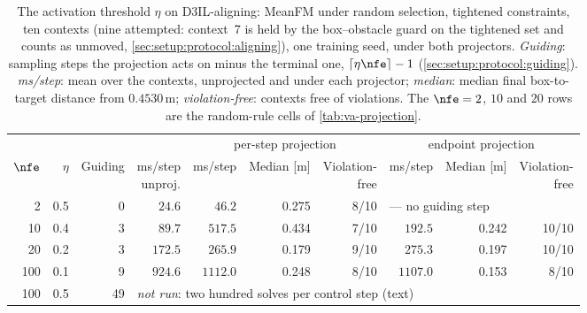 \begin{table}[htpb]
  \caption[Alignment: the activation threshold across the budget ladder]{The activation threshold
  $\eta$ on D3IL-aligning: MeanFM under random selection, tightened constraints, ten contexts (nine attempted:
  context~7 is held by the box--obstacle guard on the tightened set and counts as unmoved,
  \autoref{sec:setup:protocol:aligning}), one training seed, under both projectors. \emph{Guiding}: sampling steps the projection acts on minus the
  terminal one, $\lceil \eta\nfe \rceil - 1$ (\autoref{sec:setup:protocol:guiding}). \emph{ms/step}:
  mean over the contexts, unprojected and under each projector;
  \emph{median}: median final box-to-target distance from $0.4530$\,m; \emph{violation-free}: contexts free of
  violations. The $\nfe=2$, $10$ and $20$ rows are the random-rule cells of \autoref{tab:va-projection}.}
  \label{tab:va-threshold}
  \centering
  \footnotesize
  \setlength{\tabcolsep}{3pt}
  \begin{tabularx}{\linewidth}{@{}r r r r rrr rrr@{}}
    \toprule
    & & & & \multicolumn{3}{c}{per-step projection} & \multicolumn{3}{c}{endpoint projection} \\
    \cmidrule(lr){5-7}\cmidrule(l){8-10}
    $\nfe$ & $\eta$ & Guiding & \shortstack{ms/step\\unproj.} & ms/step & Median [m] & \shortstack{Violation-\\free} & ms/step & Median [m] & \shortstack{Violation-\\free} \\
    \midrule
    2   & 0.5 & 0  & $24.6$  & $46.2$  & 0.275 & 8/10  & \multicolumn{3}{l}{--- no guiding step} \\
    10  & 0.4 & 3  & $89.7$  & $517.5$ & 0.434 & 7/10  & $192.5$ & 0.242 & 10/10 \\
    20  & 0.2 & 3  & $172.5$ & $265.9$ & 0.179 & 9/10  & $275.3$ & 0.197 & 10/10 \\
    100 & 0.1 & 9  & $924.6$ & $1112.0$ & 0.248 & 8/10 & $1107.0$ & 0.153 & 8/10 \\
    100 & 0.5 & 49 & \multicolumn{7}{l}{\emph{not run}: two hundred solves per control step (text)} \\
    \bottomrule
  \end{tabularx}
\end{table}

